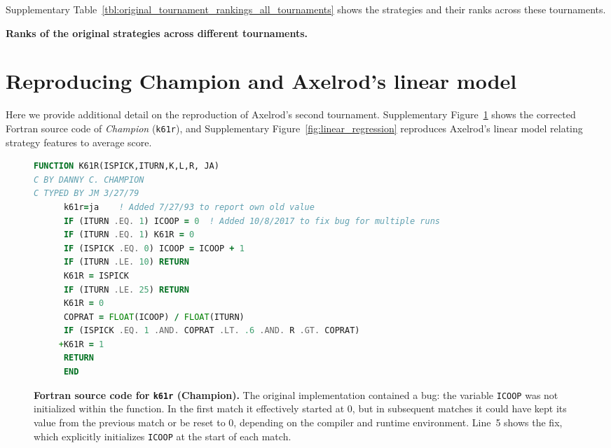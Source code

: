 \documentclass{article}
\begin{document}
Supplementary Table~\ref{tbl:original_tournament_rankings_all_tournaments} shows
the strategies and their ranks across these tournaments.

\begin{table}[!hbtp]
    \resizebox{\textwidth}{!}{
    \centering
    }
    \caption{\textbf{Ranks of the original strategies across different tournaments.}}
    \label{tbl:original_tournament_rankings_all_tournaments}
\end{table}


\section{Reproducing Champion and Axelrod's linear model}\label{app:reproduction_details}

Here we provide additional detail on the reproduction of Axelrod's second
tournament. Supplementary Figure~\ref{fig:champion_fortran} shows the corrected
Fortran source code of \emph{Champion} (\texttt{k61r}), and
Supplementary Figure~\ref{fig:linear_regression} reproduces Axelrod's linear
model relating strategy features to average score.

\begin{figure}[!hbtp]
    \begin{center}
        \begin{lstlisting}[language=Fortran,
                           basicstyle=\ttfamily\small,
                           frame=single,
                           keywordstyle=\color{red}\bfseries,
                           commentstyle=\color{teal}\itshape]
      FUNCTION K61R(ISPICK,ITURN,K,L,R, JA)
C BY DANNY C. CHAMPION
C TYPED BY JM 3/27/79
      k61r=ja    ! Added 7/27/93 to report own old value
      IF (ITURN .EQ. 1) ICOOP = 0  ! Added 10/8/2017 to fix bug for multiple runs
      IF (ITURN .EQ. 1) K61R = 0
      IF (ISPICK .EQ. 0) ICOOP = ICOOP + 1
      IF (ITURN .LE. 10) RETURN
      K61R = ISPICK
      IF (ITURN .LE. 25) RETURN
      K61R = 0
      COPRAT = FLOAT(ICOOP) / FLOAT(ITURN)
      IF (ISPICK .EQ. 1 .AND. COPRAT .LT. .6 .AND. R .GT. COPRAT)
     +K61R = 1
      RETURN
      END
        \end{lstlisting}
    \caption{\textbf{Fortran source code for \texttt{k61r} (Champion).}
    The original implementation contained a bug: the variable \texttt{ICOOP} was not
    initialized within the function. In the first match it effectively started at 0,
    but in subsequent matches it could have kept its value from the previous match or be reset to 0,
    depending on the compiler and runtime environment. Line~5 shows the fix, which
    explicitly initializes \texttt{ICOOP} at the start of each match.}
    \label{fig:champion_fortran}
    \end{center}
\end{figure}
\end{document}
